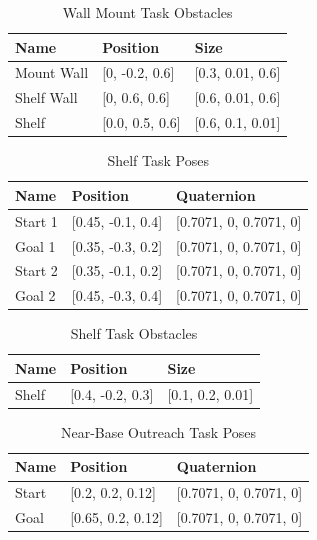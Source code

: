 \documentclass[defaultstyle,11pt]{thesis}
\begin{document}
\begin{table}[H]
    \centering
    \caption{Wall Mount Task Obstacles}
    \label{tab:wallMountObstacles}
    \begin{tabular}{lll}
    \hline
    \textbf{Name} & \textbf{Position} & \textbf{Size} \\
    \hline
    Mount Wall & [0, -0.2, 0.6] & [0.3, 0.01, 0.6] \\
    Shelf Wall & [0, 0.6, 0.6] & [0.6, 0.01, 0.6] \\
    Shelf & [0.0, 0.5, 0.6] & [0.6, 0.1, 0.01] \\
    \hline
    \end{tabular}
\end{table}

\begin{table}[H]
    \centering
    \caption{Shelf Task Poses}
    \label{tab:simpleShelfPoses}
    \begin{tabular}{lll}
    \hline
    \textbf{Name} & \textbf{Position} & \textbf{Quaternion} \\
    \hline
    Start 1 & [0.45, -0.1, 0.4] & [0.7071, 0, 0.7071, 0] \\
    Goal 1 & [0.35, -0.3, 0.2] & [0.7071, 0, 0.7071, 0] \\
    Start 2 & [0.35, -0.1, 0.2] & [0.7071, 0, 0.7071, 0] \\
    Goal 2 & [0.45, -0.3, 0.4] & [0.7071, 0, 0.7071, 0] \\
    \hline
    \end{tabular}
\end{table}

\begin{table}[H]
    \centering
    \caption{Shelf Task Obstacles}
    \label{tab:simpleShelfObstacles}
    \begin{tabular}{lll}
    \hline
    \textbf{Name} & \textbf{Position} & \textbf{Size} \\
    \hline
    Shelf & [0.4, -0.2, 0.3] & [0.1, 0.2, 0.01] \\
    \hline
    \end{tabular}
\end{table}

\begin{table}[H]
    \centering
    \caption{Near-Base Outreach Task Poses}
    \label{tab:outreachPoses}
    \begin{tabular}{lll}
    \hline
    \textbf{Name} & \textbf{Position} & \textbf{Quaternion} \\
    \hline
    Start & [0.2, 0.2, 0.12] & [0.7071, 0, 0.7071, 0] \\
    Goal & [0.65, 0.2, 0.12] & [0.7071, 0, 0.7071, 0] \\
    \hline
    \end{tabular}
\end{table}
\end{document}
